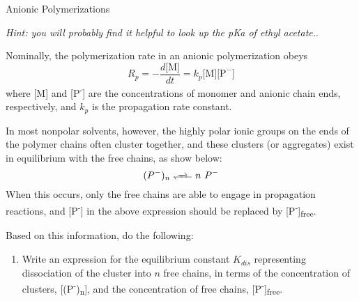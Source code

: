 \begin{activity}{Anionic Polymerizations}
\begin{exercises}
\begin{enumerate}
				\emph{Hint: you will probably find it helpful to look up the pKa of ethyl acetate.}.
			
				\begin{solution}\end{solution}
				
		\end{enumerate}

	\exercise Nominally, the polymerization rate in an anionic polymerization obeys
		\begin{equation*}
			R_p = -\frac{d\text{[M]}}{dt} = k_p\text{[M][P}^-\text{]}
		\end{equation*}
		where [M] and [P\textsuperscript{-}] are the concentrations of monomer and anionic chain ends, respectively, and $k_p$ is the propagation rate constant.
		
		In most nonpolar solvents, however, the highly polar ionic groups on the ends of the polymer chains often cluster together, and these clusters (or aggregates) exist in equilibrium with the free chains, as show below:
			\begin{equation*}
				(P^-)_n \ce{<<=>} n\,\,P^-
			\end{equation*}
		When this occurs, only the free chains are able to engage in propagation reactions, and [P\textsuperscript{-}] in the above expression should be replaced by [P\textsuperscript{-}]\textsubscript{free}.
		
		Based on this information, do the following:
		\begin{enumerate}
			\item Write an expression for the equilibrium constant $K_{dis}$ representing dissociation of the cluster into $n$ free chains, in terms of the concentration of clusters, [(P\textsuperscript{-})\textsubscript{n}], and the concentration of free chains, [P\textsuperscript{-}]\textsubscript{free}.
				
				\begin{solution}\end{solution}
				

\end{enumerate}
\end{exercises}
\end{activity}
